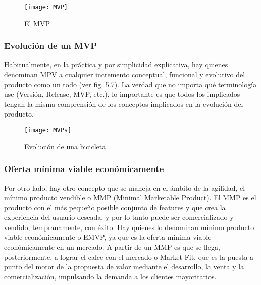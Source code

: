 \begin{figure}[h]
  \centering
  \texttt{[image: MVP]}
  \caption{El MVP}
  \centering
  \label{fig:MVP} %
\end{figure}
\FloatBarrier %


\subsubsection{Evolución de un MVP}

Habitualmente, en la práctica y por simplicidad explicativa, hay quienes denominan MPV a cualquier incremento conceptual, funcional y evolutivo del producto como un todo (ver fig. 5.7). La verdad que no importa qué terminología use (Versión, Release, MVP, etc.), lo importante es que todos los implicados tengan la misma comprensión de los conceptos implicados en la evolución del producto.

\begin{figure}[h]
  \centering
  \texttt{[image: MVPs]}
  \caption{Evolución de una bicicleta}
  \centering
  \label{fig:MVPs} %
\end{figure}
\FloatBarrier %

\subsubsection{Oferta mínima viable económicamente}

Por otro lado, hay otro concepto que se maneja en el ámbito de la agilidad, el mínimo producto vendible o MMP (Minimal Marketable Product). El MMP es el producto con el más pequeño posible conjunto de features y que crea la experiencia del usuario deseada, y por lo tanto puede ser comercializado y vendido, tempranamente, con éxito. Hay quienes lo denominan mínimo producto viable económicamente o EMVP, ya que es la oferta mínima viable económicamente en un mercado. A partir de un MMP es que se llega, posteriormente, a lograr el calce con el mercado o Market-Fit, que es la puesta a punto del motor de la propuesta de valor mediante el desarrollo, la venta y la comercialización, impulsando la demanda a los clientes mayoritarios.

